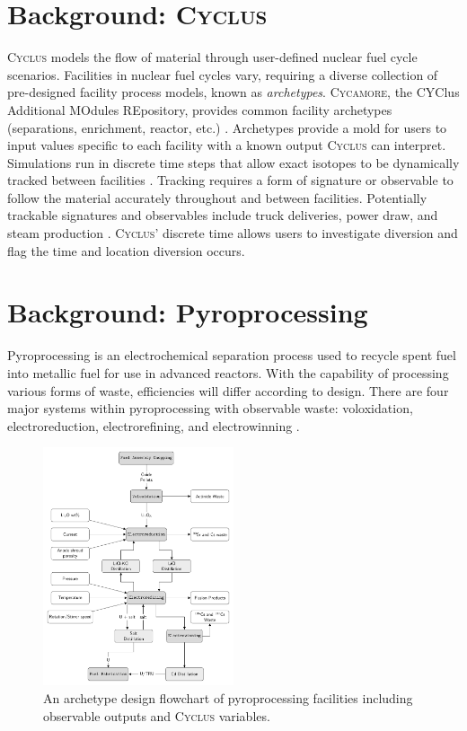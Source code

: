 \documentclass{anstrans}
\newcommand{\Cyclus}{\textsc{Cyclus}\xspace}%
\newcommand{\Cycamore}{\textsc{Cycamore}\xspace}%
\begin{document}
\section{Background: \Cyclus}
\Cyclus models the flow of material through user-defined nuclear fuel cycle scenarios. Facilities in nuclear fuel cycles vary, 
requiring a diverse collection of pre-designed facility process models, known as \emph{archetypes}. \Cycamore, the CYClus 
Additional MOdules REpository, provides common facility archetypes (separations, enrichment, reactor, etc.)
\cite{huff_extensions_2014}. Archetypes provide a mold for users to input values specific to each facility with a known output 
\Cyclus can interpret. Simulations run in discrete time steps that allow exact isotopes to be dynamically tracked between facilities \cite{huff_fundamental_2016}. Tracking requires a form of signature or observable to follow the material accurately throughout 
and between facilities. Potentially trackable signatures and observables include truck deliveries, power draw, and steam production  \cite{Hou_2016,Yilmaz_2016}.
\Cyclus' discrete time allows users to investigate diversion and flag the time and location diversion occurs.

\section{Background: Pyroprocessing}
Pyroprocessing is an electrochemical separation process used to recycle spent fuel into metallic fuel for use in advanced reactors.
With the capability of processing various forms of waste, efficiencies will differ according to design. There are four major 
systems within pyroprocessing with observable waste: voloxidation, electroreduction, electrorefining, and electrowinning \cite{Borrelli_2017}.  

\begin{figure}[ht] %
	\centering
	\includegraphics[width=0.5\textwidth]{flowchart}
	\caption{An archetype design flowchart of pyroprocessing facilities including observable outputs and \Cyclus variables.}
	\label{fig:flowchart}
\end{figure}
\end{document}
